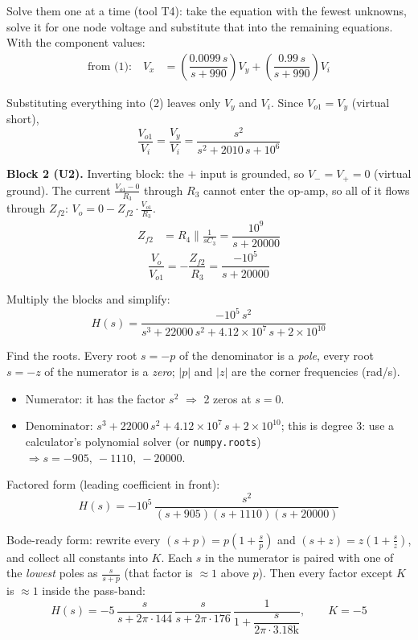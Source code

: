 \documentclass[11pt]{article}
\newcommand{\solstep}[2]{\par\medskip{\color{stepc}\textbf{Step #1 --- #2}}\par\nopagebreak}
\begin{document}
Solve them one at a time (tool T4): take the equation with the fewest unknowns, solve it for one node voltage and substitute that into the remaining equations. With the component values:
\begin{align*}
\text{from (1):}\quad V_{x} &= \left(\dfrac{0.0099\,s}{s + 990}\right)V_{y} + \left(\dfrac{0.99\,s}{s + 990}\right)V_i
\end{align*}

Substituting everything into (2) leaves only $V_{y}$ and $V_i$. Since $V_{o1} = V_{y}$ (virtual short),\[
\frac{V_{o1}}{V_i} = \frac{V_{y}}{V_i} = \dfrac{s^{2}}{s^{2} + 2010\,s + 10^{6}}
\]

\textbf{Block 2 (U2).} Inverting block: the $+$ input is grounded, so $V_- = V_+ = 0$ (virtual ground). The current $\frac{V_{o1} - 0}{R_{3}}$ through $R_{3}$ cannot enter the op-amp, so all of it flows through $Z_{f2}$: $V_{o} = 0 - Z_{f2}\cdot\frac{V_{o1}}{R_{3}}$.\begin{align*}
Z_{f2} &= R_{4} \parallel \frac{1}{sC_{3}} = \dfrac{10^{9}}{s + 20000}
\end{align*}
\[
\frac{V_{o}}{V_{o1}} = -\frac{Z_{f2}}{R_{3}} = \dfrac{-10^{5}}{s + 20000}
\]

Multiply the blocks and simplify:\[
H(s) = \dfrac{-10^{5}\,s^{2}}{s^{3} + 22000\,s^{2} + 4.12\times 10^{7}\,s + 2\times 10^{10}}
\]

\solstep{5}{Standard (Bode-ready) form}Find the roots. Every root $s=-p$ of the denominator is a \emph{pole}, every root $s=-z$ of the numerator is a \emph{zero}; $|p|$ and $|z|$ are the corner frequencies (rad/s).
\begin{itemize}[leftmargin=*,itemsep=2pt]
\item Numerator: it has the factor $s^2$ $\Rightarrow$ 2 zeros at $s=0$.
\item Denominator: $s^{3} + 22000\,s^{2} + 4.12\times 10^{7}\,s + 2\times 10^{10}$; this is degree 3: use a calculator's polynomial solver (or \texttt{numpy.roots}) $\Rightarrow s = -905,\ -1110,\ -20000$.
\end{itemize}

Factored form (leading coefficient in front):
\[
H(s) = -10^{5}\,\dfrac{s^{2}}{(s+905)(s+1110)(s+20000)}
\]

Bode-ready form: rewrite every $(s+p) = p\left(1+\frac{s}{p}\right)$ and $(s+z) = z\left(1+\frac{s}{z}\right)$, and collect all constants into $K$. Each $s$ in the numerator is paired with one of the \emph{lowest} poles as $\frac{s}{s+p}$ (that factor is $\approx 1$ above $p$). Then every factor except $K$ is $\approx 1$ inside the pass-band:
\[
H(s) = -5\,\dfrac{s}{s+2\pi\cdot 144}\,\dfrac{s}{s+2\pi\cdot 176}\,\dfrac{1}{1+\dfrac{s}{2\pi\cdot 3.18\mathrm{k}}},\qquad K = -5
\]
\end{document}
